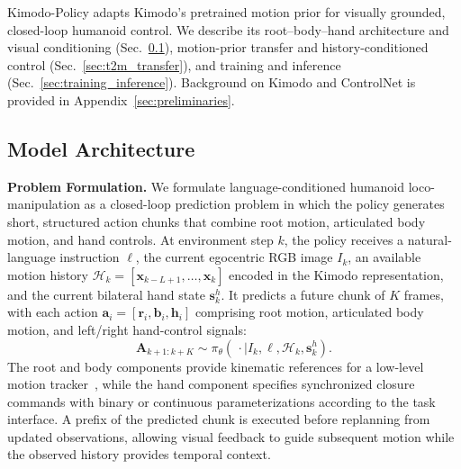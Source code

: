Kimodo-Policy adapts Kimodo's pretrained motion prior for visually grounded, closed-loop humanoid control. We describe its root--body--hand architecture and visual conditioning (Sec.~\ref{sec:method_architecture}), motion-prior transfer and history-conditioned control (Sec.~\ref{sec:t2m_transfer}), and training and inference (Sec.~\ref{sec:training_inference}). Background on Kimodo and ControlNet is provided in Appendix~\ref{sec:preliminaries}.

\subsection{Model Architecture}
\label{sec:method_architecture}

\textbf{Problem Formulation.} We formulate language-conditioned humanoid loco-manipulation as a closed-loop prediction problem in which the policy generates short, structured action chunks that combine root motion, articulated body motion, and hand controls. At environment step $k$, the policy receives a natural-language instruction $\ell$, the current egocentric RGB image $I_k$, an available motion history $\mathcal{H}_k=[\mathbf{x}_{k-L+1},\ldots,\mathbf{x}_k]$ encoded in the Kimodo representation, and the current bilateral hand state $\mathbf{s}^{h}_k$. It predicts a future chunk of $K$ frames, with each action $\mathbf{a}_i=[\mathbf{r}_i,\mathbf{b}_i,\mathbf{h}_i]$ comprising root motion, articulated body motion, and left/right hand-control signals:
\begin{equation}
  \mathbf{A}_{k+1:k+K}\sim\pi_{\theta}(\,\cdot\mid I_k,\ell,\mathcal{H}_k,\mathbf{s}^{h}_k).
  \label{eq:policy_formulation}
\end{equation}
The root and body components provide kinematic references for a low-level motion tracker~\cite{ze2025twist2scalableportableholistic,guan2026limmtmotiontracking}, while the hand component specifies synchronized closure commands with binary or continuous parameterizations according to the task interface. A prefix of the predicted chunk is executed before replanning from updated observations, allowing visual feedback to guide subsequent motion while the observed history provides temporal context.





